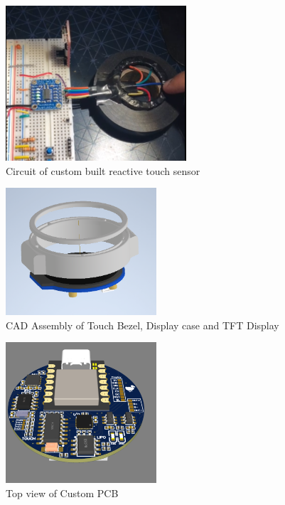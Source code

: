 \documentclass[12pt, titlepage]{article}
\begin{document}
\begin{figure}[H]
	\begin{center}
		 \includegraphics[width=0.6\textwidth]{TouchSensor}
		\caption{Circuit of custom built reactive touch sensor}
		\label{TouchSensor} 
	\end{center}
\end{figure}

\begin{figure}[H]
	\begin{center}
		 \includegraphics[width=0.5\textwidth]{WatchCAD}
		\caption{CAD Assembly of Touch Bezel, Display case and TFT Display}
		\label{WatchCAD} 
	\end{center}
\end{figure}

\begin{figure}[H]
	\begin{center}
		 \includegraphics[width=0.5\textwidth]{PCBTOP}
		\caption{Top view of Custom PCB}
		\label{PCBTOP} 
	\end{center}
\end{figure}
\end{document}
